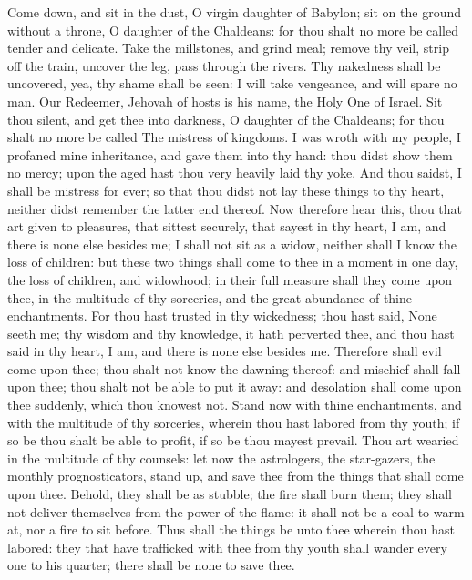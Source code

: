 Come down, and sit in the dust, O virgin daughter of Babylon; sit on the ground without a throne, O daughter of the Chaldeans: for thou shalt no more be called tender and delicate. Take the millstones, and grind meal; remove thy veil, strip off the train, uncover the leg, pass through the rivers. Thy nakedness shall be uncovered, yea, thy shame shall be seen: I will take vengeance, and will spare no man. Our Redeemer, Jehovah of hosts is his name, the Holy One of Israel. Sit thou silent, and get thee into darkness, O daughter of the Chaldeans; for thou shalt no more be called The mistress of kingdoms. I was wroth with my people, I profaned mine inheritance, and gave them into thy hand: thou didst show them no mercy; upon the aged hast thou very heavily laid thy yoke. And thou saidst, I shall be mistress for ever; so that thou didst not lay these things to thy heart, neither didst remember the latter end thereof.  Now therefore hear this, thou that art given to pleasures, that sittest securely, that sayest in thy heart, I am, and there is none else besides me; I shall not sit as a widow, neither shall I know the loss of children: but these two things shall come to thee in a moment in one day, the loss of children, and widowhood; in their full measure shall they come upon thee, in the multitude of thy sorceries, and the great abundance of thine enchantments. For thou hast trusted in thy wickedness; thou hast said, None seeth me; thy wisdom and thy knowledge, it hath perverted thee, and thou hast said in thy heart, I am, and there is none else besides me. Therefore shall evil come upon thee; thou shalt not know the dawning thereof: and mischief shall fall upon thee; thou shalt not be able to put it away: and desolation shall come upon thee suddenly, which thou knowest not.  Stand now with thine enchantments, and with the multitude of thy sorceries, wherein thou hast labored from thy youth; if so be thou shalt be able to profit, if so be thou mayest prevail. Thou art wearied in the multitude of thy counsels: let now the astrologers, the star-gazers, the monthly prognosticators, stand up, and save thee from the things that shall come upon thee. Behold, they shall be as stubble; the fire shall burn them; they shall not deliver themselves from the power of the flame: it shall not be a coal to warm at, nor a fire to sit before. Thus shall the things be unto thee wherein thou hast labored: they that have trafficked with thee from thy youth shall wander every one to his quarter; there shall be none to save thee. 

